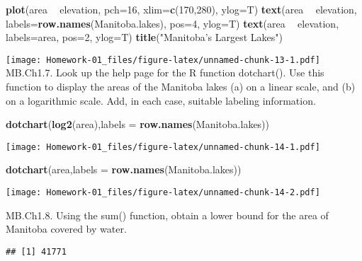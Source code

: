 \documentclass[
]{article}
\newenvironment{Shaded}{\begin{snugshade}}{\end{snugshade}}
\newcommand{\DataTypeTok}[1]{\textcolor[rgb]{0.13,0.29,0.53}{#1}}
\newcommand{\DecValTok}[1]{\textcolor[rgb]{0.00,0.00,0.81}{#1}}
\newcommand{\KeywordTok}[1]{\textcolor[rgb]{0.13,0.29,0.53}{\textbf{#1}}}
\newcommand{\NormalTok}[1]{#1}
\newcommand{\OperatorTok}[1]{\textcolor[rgb]{0.81,0.36,0.00}{\textbf{#1}}}
\newcommand{\StringTok}[1]{\textcolor[rgb]{0.31,0.60,0.02}{#1}}
\begin{document}
\begin{Shaded}
\begin{Highlighting}[]
\KeywordTok{plot}\NormalTok{(area }\OperatorTok{~}\StringTok{ }\NormalTok{elevation, }\DataTypeTok{pch=}\DecValTok{16}\NormalTok{, }\DataTypeTok{xlim=}\KeywordTok{c}\NormalTok{(}\DecValTok{170}\NormalTok{,}\DecValTok{280}\NormalTok{), }\DataTypeTok{ylog=}\NormalTok{T)}
\KeywordTok{text}\NormalTok{(area }\OperatorTok{~}\StringTok{ }\NormalTok{elevation, }\DataTypeTok{labels=}\KeywordTok{row.names}\NormalTok{(Manitoba.lakes), }\DataTypeTok{pos=}\DecValTok{4}\NormalTok{, }\DataTypeTok{ylog=}\NormalTok{T)}
\KeywordTok{text}\NormalTok{(area }\OperatorTok{~}\StringTok{ }\NormalTok{elevation, }\DataTypeTok{labels=}\NormalTok{area, }\DataTypeTok{pos=}\DecValTok{2}\NormalTok{, }\DataTypeTok{ylog=}\NormalTok{T) }
\KeywordTok{title}\NormalTok{(}\StringTok{"Manitoba’s Largest Lakes"}\NormalTok{)}
\end{Highlighting}
\end{Shaded}

\texttt{[image: Homework-01\_files/figure-latex/unnamed-chunk-13-1.pdf]}
MB.Ch1.7. Look up the help page for the R function dotchart(). Use this
function to display the areas of the Manitoba lakes (a) on a linear
scale, and (b) on a logarithmic scale. Add, in each case, suitable
labeling information.

\begin{Shaded}
\begin{Highlighting}[]
\KeywordTok{dotchart}\NormalTok{(}\KeywordTok{log2}\NormalTok{(area),}\DataTypeTok{labels =} \KeywordTok{row.names}\NormalTok{(Manitoba.lakes))}
\end{Highlighting}
\end{Shaded}

\texttt{[image: Homework-01\_files/figure-latex/unnamed-chunk-14-1.pdf]}

\begin{Shaded}
\begin{Highlighting}[]
\KeywordTok{dotchart}\NormalTok{(area,}\DataTypeTok{labels =} \KeywordTok{row.names}\NormalTok{(Manitoba.lakes))}
\end{Highlighting}
\end{Shaded}

\texttt{[image: Homework-01\_files/figure-latex/unnamed-chunk-14-2.pdf]}

MB.Ch1.8. Using the sum() function, obtain a lower bound for the area of
Manitoba covered by water.

\begin{Shaded}
\end{Shaded}

\begin{verbatim}
## [1] 41771
\end{verbatim}
\end{document}
